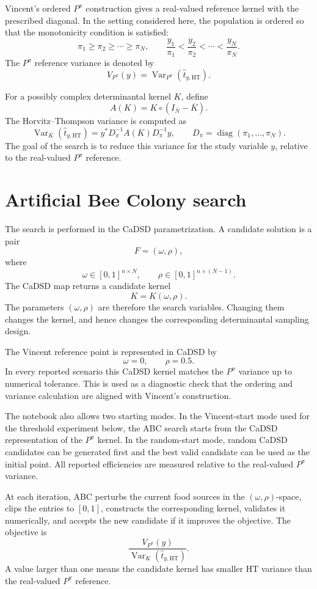 \documentclass[12pt]{article}
\newcommand{\HT}{\mathrm{HT}}
\newcommand{\Var}{\operatorname{Var}}
\newcommand{\diag}{\operatorname{diag}}
\newcommand{\Had}{\circ}
\newcommand{\Ppi}{P^{\pi}}
\begin{document}
Vincent's ordered \(\Ppi\) construction gives a real-valued reference kernel with the prescribed diagonal. In the setting considered here, the population is ordered so that the monotonicity condition is satisfied:
\[
    \pi_1\geq \pi_2\geq \cdots \geq \pi_N,
    \qquad
    \frac{y_1}{\pi_1}
    <
    \frac{y_2}{\pi_2}
    <
    \cdots
    <
    \frac{y_N}{\pi_N}.
\]
The \(\Ppi\) reference variance is denoted by
\[
    V_{\Ppi}(y)=\Var_{\Ppi}(\widehat t_{y,\HT}).
\]

For a possibly complex determinantal kernel \(K\), define
\[
    A(K)=K\Had(I_N-\overline K).
\]
The Horvitz--Thompson variance is computed as
\[
    \Var_K(\widehat t_{y,\HT})
    =
    y^*D_\pi^{-1}A(K)D_\pi^{-1}y,
    \qquad
    D_\pi=\diag(\pi_1,\ldots,\pi_N).
\]
The goal of the search is to reduce this variance for the study variable \(y\), relative to the real-valued \(\Ppi\) reference.

\section{Artificial Bee Colony search}

The search is performed in the CaDSD parametrization. A candidate solution is a pair
\[
    F=(\omega,\rho),
\]
where
\[
    \omega\in[0,1]^{n\times N},
    \qquad
    \rho\in[0,1]^{n\times (N-1)}.
\]
The CaDSD map returns a candidate kernel
\[
    K=K(\omega,\rho).
\]
The parameters \((\omega,\rho)\) are therefore the search variables. Changing them changes the kernel, and hence changes the corresponding determinantal sampling design.

The Vincent reference point is represented in CaDSD by
\[
    \omega=0,
    \qquad
    \rho=0.5.
\]
In every reported scenario this CaDSD kernel matches the \(\Ppi\) variance up to numerical tolerance. This is used as a diagnostic check that the ordering and variance calculation are aligned with Vincent's construction.

The notebook also allows two starting modes. In the Vincent-start mode used for the threshold experiment below, the ABC search starts from the CaDSD representation of the \(\Ppi\) kernel. In the random-start mode, random CaDSD candidates can be generated first and the best valid candidate can be used as the initial point. All reported efficiencies are measured relative to the real-valued \(\Ppi\) variance.

At each iteration, ABC perturbs the current food sources in the \((\omega,\rho)\)-space, clips the entries to \([0,1]\), constructs the corresponding kernel, validates it numerically, and accepts the new candidate if it improves the objective. The objective is
\[
    \frac{V_{\Ppi}(y)}{\Var_K(\widehat t_{y,\HT})}.
\]
A value larger than one means the candidate kernel has smaller HT variance than the real-valued \(\Ppi\) reference.
\end{document}
